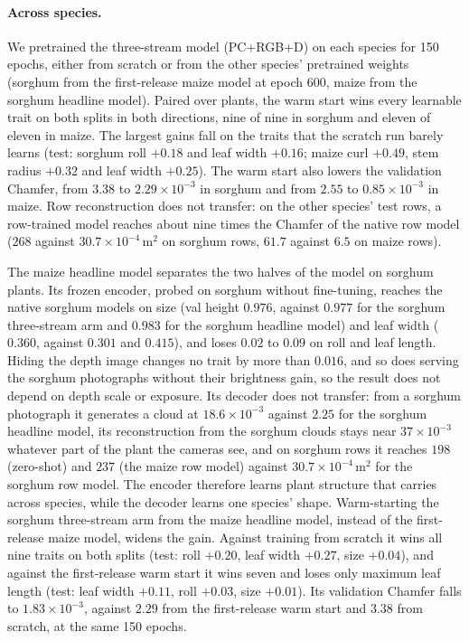 \paragraph{Across species.}
We pretrained the three-stream model (PC+RGB+D) on each species for 150
epochs, either from scratch or from the other species' pretrained weights
(sorghum from the first-release maize model at epoch 600, maize from the sorghum
headline model). Paired over plants, the warm start wins every learnable trait
on both splits in both directions, nine of nine in sorghum and eleven of eleven
in maize. The largest gains fall on the traits that the scratch run barely
learns (test: sorghum roll $+0.18$ and leaf width $+0.16$; maize curl $+0.49$,
stem radius $+0.32$ and leaf width $+0.25$). The warm start also lowers the
validation Chamfer, from $3.38$ to $2.29\times10^{-3}$ in sorghum and from
$2.55$ to $0.85\times10^{-3}$ in maize. Row reconstruction does not transfer:
on the other species' test rows, a row-trained model reaches about nine times
the Chamfer of the native row model ($268$ against $30.7\times10^{-4}$\,m$^2$
on sorghum rows, $61.7$ against $6.5$ on maize rows).

The maize headline model separates the two halves of the model on sorghum
plants. Its frozen encoder, probed on sorghum without fine-tuning, reaches the
native sorghum models on size (val height $0.976$, against $0.977$ for the
sorghum three-stream arm and $0.983$ for the sorghum headline model) and leaf
width ($0.360$, against $0.301$ and $0.415$), and loses $0.02$ to $0.09$ on roll
and leaf length. Hiding the depth image changes no trait by more than $0.016$,
and so does serving the sorghum photographs without their brightness gain, so
the result does not depend on depth scale or exposure. Its decoder does not
transfer: from a sorghum photograph it generates a cloud at
$18.6\times10^{-3}$ against $2.25$ for the sorghum headline model, its
reconstruction from the sorghum clouds stays near $37\times10^{-3}$ whatever
part of the plant the cameras see, and on sorghum rows it reaches $198$
(zero-shot) and $237$ (the maize row model) against $30.7\times10^{-4}$\,m$^2$
for the sorghum row model. The encoder therefore learns plant structure that
carries across species, while the decoder learns one species' shape.
Warm-starting the sorghum three-stream arm from the maize headline model, instead
of the first-release maize model, widens the gain. Against training from scratch
it wins all nine traits on both splits (test: roll $+0.20$, leaf width $+0.27$,
size $+0.04$), and against the first-release warm start it wins seven and loses
only maximum leaf length (test: leaf width $+0.11$, roll $+0.03$, size $+0.01$).
Its validation Chamfer falls to $1.83\times10^{-3}$, against $2.29$ from the
first-release warm start and $3.38$ from scratch, at the same 150 epochs.

